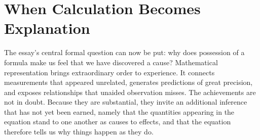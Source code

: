 \documentclass[11pt,letterpaper]{article}
\theoremstyle{definition}
\begin{document}
\section{When Calculation Becomes Explanation}

The essay's central formal question can now be put: why does possession of a formula make us feel that we have discovered a cause? Mathematical representation brings extraordinary order to experience. It connects measurements that appeared unrelated, generates predictions of great precision, and exposes relationships that unaided observation misses. The achievements are not in doubt. Because they are substantial, they invite an additional inference that has not yet been earned, namely that the quantities appearing in the equation stand to one another as causes to effects, and that the equation therefore tells us why things happen as they do.
\end{document}
